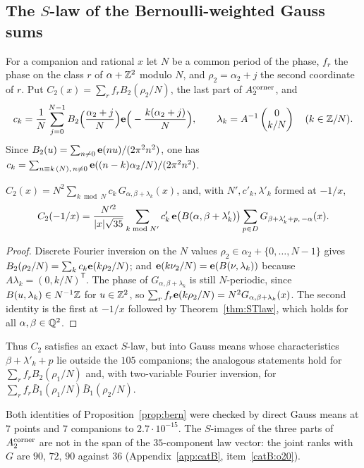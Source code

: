 \subsection{The $S$-law of the Bernoulli-weighted Gauss sums}\label{sec:bern}
For a companion and rational $x$ let $N$ be a common period of the phase, $f_r$ the phase on the class $r$ of $\alpha+\mathbb{Z}^2$ modulo $N$, and $\rho_2=\alpha_2+j$ the second
coordinate of $r$. Put $C_{2}(x)=\sum_rf_rB_2(\rho_2/N)$, the last part of $A_2^{\rm corner}$, and
\[ c_k=\frac1N\sum_{j=0}^{N-1}B_2\Big(\frac{\alpha_2+j}N\Big)\mathbf{e}\Big(-\frac{k(\alpha_2+j)}N\Big),\qquad \lambda_k=A^{-1}\begin{pmatrix}0\\k/N\end{pmatrix}\quad(k\in\mathbb{Z}/N). \]
Since $B_2(u)=\sum_{n\ne0}\mathbf{e}(nu)/(2\pi^2n^2)$, one has $c_k=\sum_{n\equiv k\,(N),\,n\ne0}\mathbf{e}((n-k)\alpha_2/N)/(2\pi^2n^2)$.
\begin{proposition}\label{prop:bern}
$C_2(x)=N^2\sum_{k\bmod N}c_k\,G_{\alpha,\beta+\lambda_k}(x)$, and, with $N',c'_k,\lambda'_k$ formed at $-1/x$,
\[ C_2(-1/x)=\frac{N'^2}{|x|\sqrt{35}}\sum_{k\bmod N'}c'_k\,\mathbf{e}\big(B(\alpha,\beta+\lambda'_k)\big)\sum_{p\in D}G_{\beta+\lambda'_k+p,\,-\alpha}(x). \]
\end{proposition}
\begin{proof}
Discrete Fourier inversion on the $N$ values $\rho_2\in\alpha_2+\{0,\dots,N-1\}$ gives $B_2(\rho_2/N)=\sum_kc_k\mathbf{e}(k\rho_2/N)$; and $\mathbf{e}(k\nu_2/N)=\mathbf{e}(B(\nu,\lambda_k))$ because
$A\lambda_k=(0,k/N)^{\mathsf T}$. The phase of $G_{\alpha,\beta+\lambda_k}$ is still $N$-periodic, since $B(u,\lambda_k)\in N^{-1}\mathbb{Z}$ for $u\in\mathbb{Z}^2$, so
$\sum_rf_r\mathbf{e}(k\rho_2/N)=N^2G_{\alpha,\beta+\lambda_k}(x)$. The second identity is the first at $-1/x$ followed by Theorem~\ref{thm:STlaw}, which holds for all $\alpha,\beta\in\mathbb{Q}^2$.
\end{proof}
Thus $C_2$ satisfies an exact $S$-law, but into Gauss means whose characteristics $\beta+\lambda'_k+p$ lie outside the $105$ companions; the analogous statements hold for
$\sum_rf_rB_2(\rho_1/N)$ and, with two-variable Fourier inversion, for $\sum_rf_r\bar B_1(\rho_1/N)\bar B_1(\rho_2/N)$.
\begin{catbremark}
Both identities of Proposition~\ref{prop:bern} were checked by direct Gauss means at $7$ points and $7$ companions to $2.7\cdot10^{-15}$. The $S$-images of the three parts of
$A_2^{\rm corner}$ are not in the span of the $35$-component law vector: the joint ranks with $G$ are $90$, $72$, $90$ against $36$ (Appendix~\ref{app:catB}, item~\ref{catB:o20}).
\end{catbremark}

